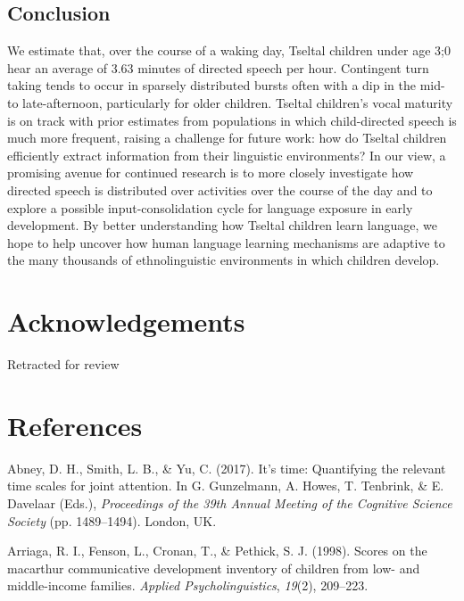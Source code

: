 \documentclass[floatsintext,man]{apa6}
\theoremstyle{definition}
\theoremstyle{definition}
\theoremstyle{definition}
\theoremstyle{remark}
\begin{document}
\subsection{Conclusion}\label{disc-conclusion}

We estimate that, over the course of a waking day, Tseltal children
under age 3;0 hear an average of 3.63 minutes of directed speech per
hour. Contingent turn taking tends to occur in sparsely distributed
bursts often with a dip in the mid- to late-afternoon, particularly for
older children. Tseltal children's vocal maturity is on track with prior
estimates from populations in which child-directed speech is much more
frequent, raising a challenge for future work: how do Tseltal children
efficiently extract information from their linguistic environments? In
our view, a promising avenue for continued research is to more closely
investigate how directed speech is distributed over activities over the
course of the day and to explore a possible input-consolidation cycle
for language exposure in early development. By better understanding how
Tseltal children learn language, we hope to help uncover how human
language learning mechanisms are adaptive to the many thousands of
ethnolinguistic environments in which children develop.

\section{Acknowledgements}\label{acknowledgements}

Retracted for review

\newpage

\section{References}\label{refs}

\begingroup
\setlength{\parindent}{-0.5in} \setlength{\leftskip}{0.5in}

\hypertarget{refs}{}
\hypertarget{ref-abney2017time}{}
Abney, D. H., Smith, L. B., \& Yu, C. (2017). It's time: Quantifying the
relevant time scales for joint attention. In G. Gunzelmann, A. Howes, T.
Tenbrink, \& E. Davelaar (Eds.), \emph{Proceedings of the 39th Annual
Meeting of the Cognitive Science Society} (pp. 1489--1494). London, UK.

\hypertarget{ref-arriaga1998scores}{}
Arriaga, R. I., Fenson, L., Cronan, T., \& Pethick, S. J. (1998). Scores
on the macarthur communicative development inventory of children from
low- and middle-income families. \emph{Applied Psycholinguistics},
\emph{19}(2), 209--223.
\end{document}
